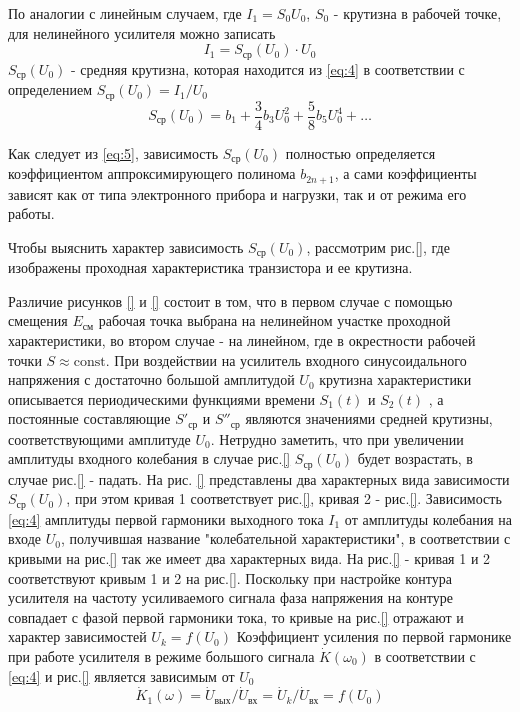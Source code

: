 По аналогии с линейным случаем, где $I_1=S_0U_0$, $S_0$ - крутизна в рабочей точке, для нелинейного усилителя можно записать 
\begin{equation}
I_1=S_\text{ср}(U_0)\cdot U_0
\label{eq:4}
\end{equation}
$S_\text{ср}(U_0)$ - средняя крутизна, которая находится из \eqref{eq:4} в соответствии с определением $S_\text{ср}(U_0)=I_1/U_0$
\begin{equation}
S_\text{ср}(U_0)=b_1+\frac{3}{4}b_3U_0^2+\frac{5}{8}b_5U_0^4+\ldots
\label{eq:5}
\end{equation}

Как следует из \eqref{eq:5}, зависимость $S_\text{ср}(U_0)$ полностью определяется коэффициентом аппроксимирующего полинома $b_{2n+1}$, а сами коэффициенты зависят как от типа электронного прибора и нагрузки, так и от режима его работы.

Чтобы выяснить характер зависимость $S_\text{ср}(U_0)$, рассмотрим рис.\ref{}, где изображены проходная характеристика транзистора и ее крутизна.

Различие рисунков \ref{} и \ref{} состоит в том, что в первом случае с помощью смещения $E_\text{см}$ рабочая точка выбрана на нелинейном участке проходной характеристики, во втором случае - на линейном, где в окрестности рабочей точки $S\approx\text{const}$. При воздействии на усилитель входного синусоидального напряжения с достаточно большой амплитудой $U_0$ крутизна характеристики описывается периодическими функциями времени $S_1(t)$ и $S_2(t)$ , а постоянные составляющие $S'_\text{ср}$ и $S''_\text{ср}$ являются значениями средней крутизны, соответствующими амплитуде $U_0$. Нетрудно заметить, что при увеличении амплитуды входного колебания в случае рис.\ref{} $S_\text{ср}(U_0)$ будет возрастать, в случае рис.\ref{} - падать. На рис. \ref{} представлены два характерных вида зависимости $S_\text{ср}(U_0)$, при этом кривая 1 соответствует рис.\ref{}, кривая 2 - рис.\ref{}.
Зависимость \eqref{eq:4} амплитуды первой гармоники выходного тока $I_1$ от амплитуды колебания на входе $U_0$, получившая название "колебательной характеристики", в соответствии с кривыми на рис.\ref{} так же имеет два характерных вида. На рис.\ref{} - кривая 1 и 2 соответствуют кривым 1 и 2 на рис.\ref{}. Поскольку при настройке контура усилителя на частоту усиливаемого сигнала фаза напряжения на контуре совпадает с фазой первой гармоники тока, то кривые на рис.\ref{} отражают и характер зависимостей $U_k=f(U_0)$
Коэффициент усиления по первой гармонике при работе усилителя в режиме большого сигнала $\dot{K}(\omega_0)$ в соответствии с \eqref{eq:4} и рис.\ref{} является зависимым от $U_0$
\begin{equation}
\dot{K}_1(\omega)=\dot{U}_\text{вых}/\dot{U}_\text{вх}=\dot{U}_k/\dot{U}_\text{вх}=f(U_0)
\label{eq:6}
\end{equation}

